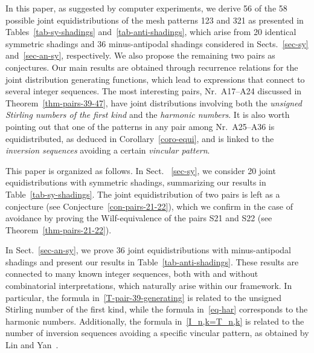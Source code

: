 \documentclass[12pt]{article}
\begin{document}
In this paper, as suggested by computer experiments, we derive 56 of the 58 possible joint equidistributions of the mesh patterns 123 and 321 as presented in Tables~\ref{tab-sy-shadings} and~\ref{tab-anti-shadings}, which arise from 20 identical symmetric shadings  and 36  minus-antipodal shadings  considered  in Sects.~\ref{sec-sy} and~\ref{sec-an-sy}, respectively.  We also propose the remaining two pairs as conjectures.
Our main results are obtained through recurrence relations for the joint distribution generating functions, which lead to expressions that connect to several integer sequences. 
The most interesting pairs, Nr.~A17--A24 discussed in Theorem~\ref{thm-pairs-39-47}, have joint distributions involving both the \emph{unsigned Stirling numbers of the first kind} and the \emph{harmonic numbers}.
It is also worth pointing out that one of the patterns in any pair among Nr.~A25--A36 is equidistributed, as deduced in Corollary~\ref{coro-equi}, and is linked to the \emph{inversion sequences} avoiding a certain \emph{vincular pattern}.

This paper is organized as follows. In Sect. ~\ref{sec-sy}, we consider 20 joint equidistributions with symmetric shadings, summarizing our results in Table~\ref{tab-sy-shadings}. The joint equidistribution of two pairs is left as a conjecture (see Conjecture~\ref{con-pairs-21-22}), which we confirm in the case of avoidance by proving the Wilf-equivalence of the pairs S21 and S22 (see Theorem~\ref{thm-pairs-21-22}).

In Sect.~\ref{sec-an-sy}, we prove 36  joint equidistributions with minus-antipodal shadings and present our results in Table~\ref{tab-anti-shadings}. These results are connected to many known integer sequences, both with and without combinatorial interpretations, which naturally arise within our framework. In particular, the formula in~\eqref{T-pair-39-generating} is related to the unsigned Stirling number of the first kind, while the formula in~\eqref{eq-har} corresponds to the harmonic numbers. Additionally, the formula in~\eqref{I_n,k=T_n,k} is related to the number of inversion sequences avoiding a specific vincular pattern, as obtained by Lin and Yan~\cite{Lin-Yan}.
\end{document}
